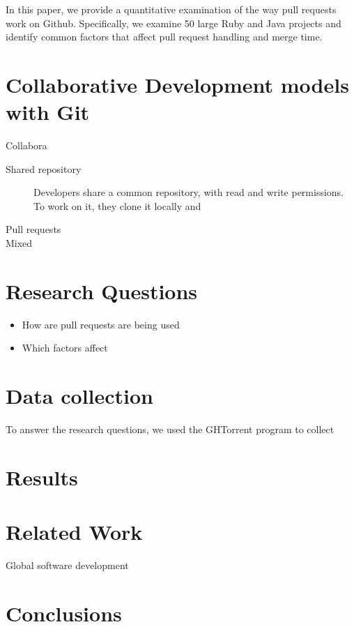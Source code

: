 \documentclass[conference]{IEEEtran}
\begin{document}
In this paper, we provide a quantitative examination of the way
pull requests work on Github. Specifically, we examine 50 large Ruby and 
Java projects and identify common factors that affect pull request
handling and merge time.

\section{Collaborative Development models with Git}

Collabora

\begin{description}

  \item[Shared repository] Developers share a common repository, with read and
    write permissions. To work on it, they clone it locally and 

  \item[Pull requests]

  \item[Mixed]

\end{description}

\section{Research Questions}

\begin{itemize}

  \item How are pull requests are being used

  \item Which factors affect 

\end{itemize}

\section{Data collection}

To answer the research questions, we used the GHTorrent program to collect

\section{Results}


\section{Related Work}

Global software development
\section{Conclusions}
\end{document}
